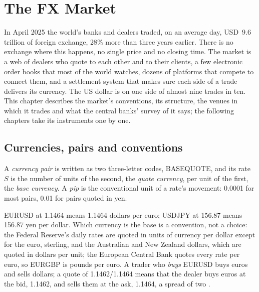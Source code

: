 \chapter{The FX Market}\label{ch:m2:the-fx-market}

In April 2025 the world's banks and dealers traded, on an average day, USD~9.6
trillion of foreign exchange, 28\% more than three years earlier. There is no
exchange where this happens, no single price and no closing time. The
market is a web of dealers who quote to each other and to their clients, a few
electronic order books that most of the world watches, dozens of platforms
that compete to connect them, and a settlement system that makes sure each side
of a trade delivers its currency. The US dollar is on one side of almost nine
trades in ten. This chapter describes the market's conventions, its
structure, the venues in which it trades and what the central banks' survey of
it says; the following chapters take its instruments one by one.

\section{Currencies, pairs and conventions}

\begin{definition}\label{def:m2:the-fx-market:pair}
A \emph{currency pair} is written as two three-letter codes,
BASEQUOTE, and its rate $S$ is the number of units of the second, the
\emph{quote currency}, per unit of the first, the
\emph{base currency}. A \emph{pip} is the
conventional unit of a rate's movement: 0.0001 for most pairs, 0.01 for pairs
quoted in yen.
\end{definition}

EURUSD at 1.1464 means 1.1464 dollars per euro; USDJPY at 156.87 means 156.87
yen per dollar. Which currency is the base is a convention, not a choice: the
Federal Reserve's daily rates are quoted in units of currency per dollar except
for the euro, sterling, and the Australian and New Zealand dollars, which are
quoted in dollars per unit; the European Central Bank quotes every rate per euro,
so EURGBP is pounds per euro. A trader who \emph{buys} EURUSD buys euros and
sells dollars; a quote of 1.1462/1.1464 means that the dealer buys euros at the
bid, 1.1462, and sells them at the ask, 1.1464, a spread of two .


